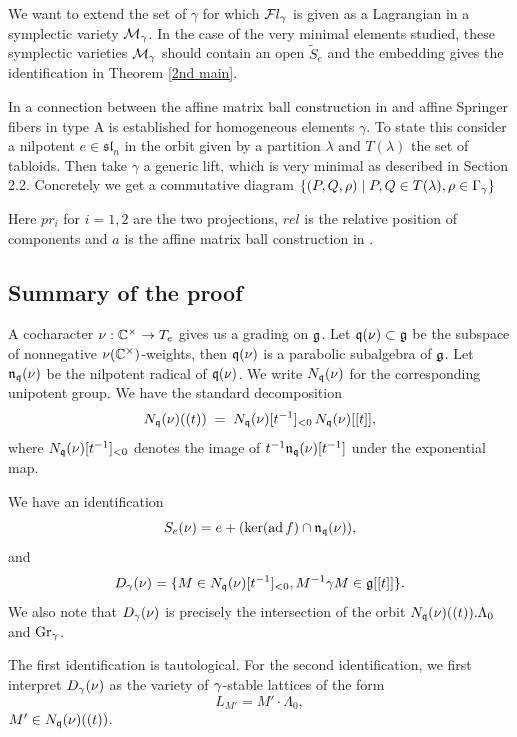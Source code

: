 \documentclass[11pt]{article}
\numberwithin{equation}{section}
\begin{document}
We want to extend the set of $\gamma$ for which $\mathcal{F}l_\gamma$ is given as a Lagrangian in a symplectic variety $\mathcal{M}_\gamma$. In the case of the very minimal elements studied, these symplectic varieties $\mathcal{M}_\gamma$ should contain an open $\widetilde{S}_e$ and the embedding gives the identification in Theorem \ref{2nd main}.

In \cite{BAYY} a connection between the affine matrix ball construction in \cite{AMBC} and affine Springer fibers in type A is established for homogeneous elements $\gamma$. To state this consider a nilpotent $ e\in\mathfrak{sl}_n$ in the orbit given by a partition $\lambda$ and $T(\lambda)$ the set of tabloids. Then take $\gamma$ a generic lift, which is very minimal as described in Section 2.2. Concretely we get a commutative diagram $\{(P,Q,\rho)\mid P,Q\in T(\lambda), \rho\in \Gamma_\gamma\}$

\begin{center}
\end{center}

Here $pr_i$ for $i=1,2$ are the two projections, $rel$ is the relative position of components and $a$ is the affine matrix ball construction in \cite{AMBC}.

\subsection{Summary of the proof}
A cocharacter $\nu: \mathbb{C}^\times \to T_e$ gives us a grading on $\mathfrak{g}$. Let $\mathfrak{q}(\nu)\subset \mathfrak{g}$ be the subspace of nonnegative $\nu(\mathbb{C}^\times)$-weights, then $\mathfrak{q}(\nu)$ is a parabolic subalgebra of $\mathfrak{g}$. Let $\mathfrak{n}_{\mathfrak{q}}(\nu)$ be the nilpotent radical of $\mathfrak{q}(\nu)$. We write $N_{\mathfrak{q}}(\nu)$ for the corresponding unipotent group. We have the standard decomposition
\[
N_{\mathfrak{q}}(\nu)((t)) \;=\; N_{\mathfrak{q}}(\nu)[t^{-1}]_{<0}\, N_{\mathfrak{q}}(\nu)[[t]],
\]
where $N_{\mathfrak{q}}(\nu)[t^{-1}]_{<0}$ denotes the image of $t^{-1}\mathfrak{n}_{\mathfrak{q}}(\nu)[t^{-1}]$ under the exponential map.

\begin{pro} \label{using nq}
    We have an identification
$$S_e(\nu)= e+ (\ker (\operatorname{ad} f)\cap \mathfrak{n}_{\mathfrak{q}}(\nu)),$$
and
$$D_\gamma(\nu)=  \{M\in N_{\mathfrak{q}}(\nu)[t^{-1}]_{<0},  M^{-1}\gamma M\in \mathfrak{g}[[t]]\}.$$
We also note that $D_\gamma(\nu)$ is precisely the intersection of the orbit $N_{\mathfrak{q}}(\nu)((t)).\Lambda_0$ and $\operatorname{Gr}_\gamma$.
\end{pro}
The first identification is tautological. For the second identification, we first interpret $D_\gamma(\nu)$ as the variety of $\gamma$-stable lattices of the form
\[
L_{M'} = M'\cdot \Lambda_0, 
\]
$ M'\in N_{\mathfrak{q}}(\nu)((t))$.
\end{document}
